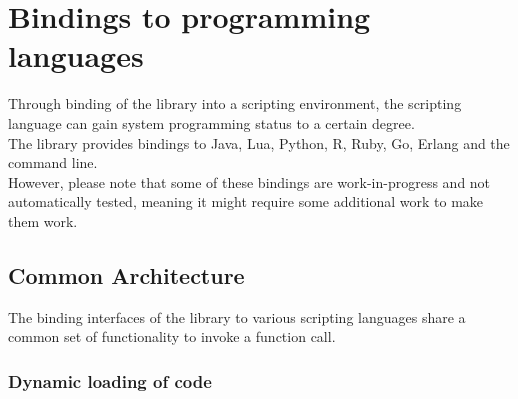 %
%
%
%

\newpage
\section{Bindings to programming languages}

Through binding of the  library into a scripting environment,
the scripting language can gain system programming status to a certain degree.\\
The  library provides bindings to Java\cite{Java},
Lua\cite{Lua}, Python\cite{Python}, R\cite{R}, Ruby\cite{Ruby}, Go\cite{Go}, Erlang\cite{Erlang} and the command line.\\
However, please note that some of these bindings are work-in-progress and not
automatically tested, meaning it might require some additional work to make them
work.

\subsection{Common Architecture}

The binding interfaces of the  library to various scripting
languages share a common set of functionality to invoke a function call.

\subsubsection{Dynamic loading of code}

